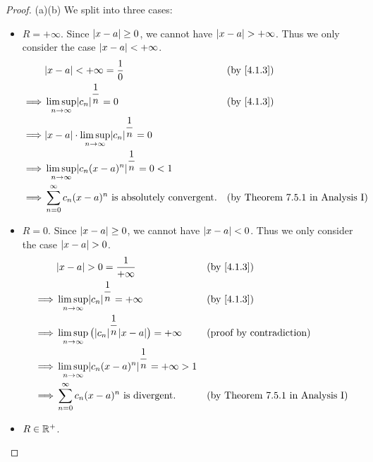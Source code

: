 \begin{proof}{(a)}{(b)}
  We split into three cases:
  \begin{itemize}
    \item \(R = +\infty\).
          Since \(\left\lvert x - a\right\rvert \geq 0\), we cannot have \(\left\lvert x - a\right\rvert > +\infty\).
          Thus we only consider the case \(\left\lvert x - a\right\rvert < +\infty\).
          \begin{align*}
                     & \abs{x - a} < +\infty = \dfrac{1}{0}                                  &  & \by{4.1.3}                              \\
            \implies & \limsup_{n \to \infty} \abs{c_n}^{\dfrac{1}{n}} = 0                   &  & \by{4.1.3}                              \\
            \implies & \abs{x - a} \cdot \limsup_{n \to \infty} \abs{c_n}^{\dfrac{1}{n}} = 0                                              \\
            \implies & \limsup_{n \to \infty} \abs{c_n (x - a)^n}^{\dfrac{1}{n}} = 0 < 1                                                  \\
            \implies & \sum_{n = 0}^\infty c_n (x - a)^n \text{ is absolutely convergent}.   &  & \text{(by Theorem 7.5.1 in Analysis I)}
          \end{align*}
    \item \(R = 0\).
          Since \(\left\lvert x - a\right\rvert \geq 0\), we cannot have \(\left\lvert x - a\right\rvert < 0\).
          Thus we only consider the case \(\left\lvert x - a\right\rvert > 0\).
          \begin{align*}
                     & \abs{x - a} > 0 = \dfrac{1}{+\infty}                                            &  & \by{4.1.3}                              \\
            \implies & \limsup_{n \to \infty} \abs{c_n}^{\dfrac{1}{n}} = +\infty                       &  & \by{4.1.3}                              \\
            \implies & \limsup_{n \to \infty} \big(\abs{c_n}^{\dfrac{1}{n}} \abs{x - a}\big) = +\infty &  & \text{(proof by contradiction)}         \\
            \implies & \limsup_{n \to \infty} \abs{c_n (x - a)^n}^{\dfrac{1}{n}} = +\infty > 1                                                      \\
            \implies & \sum_{n = 0}^\infty c_n (x - a)^n \text{ is divergent}.                         &  & \text{(by Theorem 7.5.1 in Analysis I)}
          \end{align*}
    \item \(R \in \mathbb{R}^+\).

\end{itemize}
\end{proof}

